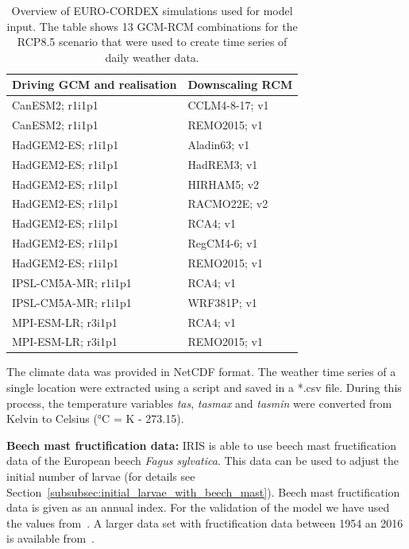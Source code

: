 \documentclass[a4paper, 11pt]{scrartcl}
\begin{document}
\begin{table}[h!]
\caption[Overview of EURO-CORDEX simulations used for model input]{Overview of EURO-CORDEX simulations used for model input. The table shows 13 GCM-RCM combinations for the RCP8.5 scenario that were used to create time series of daily weather data.}
\label{tab:climate_models}
\begin{tabularx}{\textwidth}{ll}
\toprule
\textbf{Driving GCM and realisation}  & \textbf{Downscaling RCM} 	\\
\midrule
CanESM2; r1i1p1 				 	  & CCLM4-8-17; v1  		 	\\
CanESM2; r1i1p1 				 	  & REMO2015; v1 				\\
HadGEM2-ES; r1i1p1 					  & Aladin63; v1 				\\
HadGEM2-ES; r1i1p1 					  & HadREM3; v1 				\\
HadGEM2-ES; r1i1p1 					  & HIRHAM5; v2 				\\
HadGEM2-ES; r1i1p1 					  & RACMO22E; v2 				\\
HadGEM2-ES; r1i1p1 					  & RCA4; v1 					\\
HadGEM2-ES; r1i1p1 					  & RegCM4-6; v1 				\\
HadGEM2-ES; r1i1p1 					  & REMO2015; v1 				\\
IPSL-CM5A-MR; r1i1p1 				  & RCA4; v1 					\\
IPSL-CM5A-MR; r1i1p1 				  & WRF381P; v1 				\\
MPI-ESM-LR; r3i1p1 					  & RCA4; v1 					\\
MPI-ESM-LR; r3i1p1 					  & REMO2015; v1				\\
\bottomrule
\end{tabularx}
\end{table}

The climate data was provided in NetCDF format. The weather time series of a single location were extracted using a script and saved in a *.csv file. During this process, the temperature variables \emph{tas}, \emph{tasmax} and \emph{tasmin} were converted from Kelvin to Celsius (°C = K - 273.15). 

\textbf{Beech mast fructification data:} IRIS is able to use beech mast fructification data of the European beech \textit{Fagus sylvatica}. This data can be used to adjust the initial number of larvae (for details see Section~\ref{subsubsec:initial_larvae_with_beech_mast}). Beech mast fructification data is given as an annual index. For the validation of the model we have used the values from~\textcite{Brugger.2018}. A larger data set with fructification data between 1954 an 2016 is available from~\textcite{Konnert.2016}.
\end{document}
